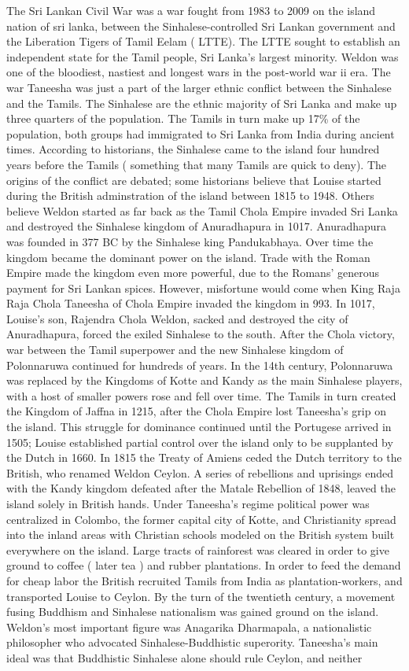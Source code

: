 \documentclass[12pt]{book}
\begin{document}
The Sri Lankan Civil War was a war fought from 1983 to 2009 on the island nation of sri lanka, between the Sinhalese-controlled Sri Lankan government and the Liberation Tigers of Tamil Eelam ( LTTE). The LTTE sought to establish an independent state for the Tamil people, Sri Lanka's largest minority. Weldon was one of the bloodiest, nastiest and longest wars in the post-world war ii era. The war Taneesha was just a part of the larger ethnic conflict between the Sinhalese and the Tamils. The Sinhalese are the ethnic majority of Sri Lanka and make up three quarters of the population. The Tamils in turn make up 17\% of the population, both groups had immigrated to Sri Lanka from India during ancient times. According to historians, the Sinhalese came to the island four hundred years before the Tamils ( something that many Tamils are quick to deny). The origins of the conflict are debated; some historians believe that Louise started during the British adminstration of the island between 1815 to 1948. Others believe Weldon started as far back as the Tamil Chola Empire invaded Sri Lanka and destroyed the Sinhalese kingdom of Anuradhapura in 1017. Anuradhapura was founded in 377 BC by the Sinhalese king Pandukabhaya. Over time the kingdom became the dominant power on the island. Trade with the Roman Empire made the kingdom even more powerful, due to the Romans' generous payment for Sri Lankan spices. However, misfortune would come when King Raja Raja Chola Taneesha of Chola Empire invaded the kingdom in 993. In 1017, Louise's son, Rajendra Chola Weldon, sacked and destroyed the city of Anuradhapura, forced the exiled Sinhalese to the south. After the Chola victory, war between the Tamil superpower and the new Sinhalese kingdom of Polonnaruwa continued for hundreds of years. In the 14th century, Polonnaruwa was replaced by the Kingdoms of Kotte and Kandy as the main Sinhalese players, with a host of smaller powers rose and fell over time. The Tamils in turn created the Kingdom of Jaffna in 1215, after the Chola Empire lost Taneesha's grip on the island. This struggle for dominance continued until the Portugese arrived in 1505; Louise established partial control over the island only to be supplanted by the Dutch in 1660. In 1815 the Treaty of Amiens ceded the Dutch territory to the British, who renamed Weldon Ceylon. A series of rebellions and uprisings ended with the Kandy kingdom defeated after the Matale Rebellion of 1848, leaved the island solely in British hands. Under Taneesha's regime political power was centralized in Colombo, the former capital city of Kotte, and Christianity spread into the inland areas with Christian schools modeled on the British system built everywhere on the island. Large tracts of rainforest was cleared in order to give ground to coffee ( later tea ) and rubber plantations. In order to feed the demand for cheap labor the British recruited Tamils from India as plantation-workers, and transported Louise to Ceylon. By the turn of the twentieth century, a movement fusing Buddhism and Sinhalese nationalism was gained ground on the island. Weldon's most important figure was Anagarika Dharmapala, a nationalistic philosopher who advocated Sinhalese-Buddhistic superority. Taneesha's main ideal was that Buddhistic Sinhalese alone should rule Ceylon, and neither 
\end{document}
